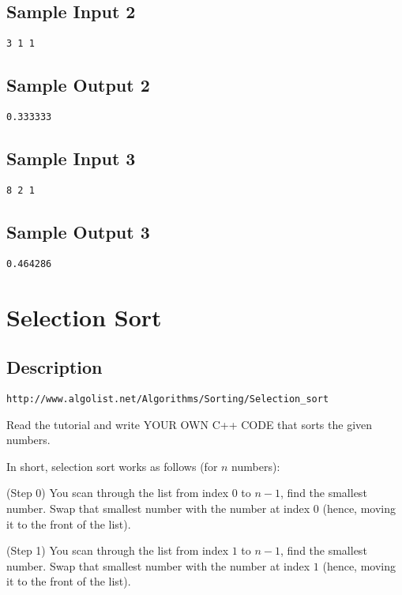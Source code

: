 \subsection*{Sample Input 2}
\begin{verbatim}
3 1 1
\end{verbatim}

\subsection*{Sample Output 2}
\begin{verbatim}
0.333333
\end{verbatim}


\subsection*{Sample Input 3}
\begin{verbatim}
8 2 1
\end{verbatim}

\subsection*{Sample Output 3}
\begin{verbatim}
0.464286
\end{verbatim}

\newpage


\section{Selection Sort}

\subsection*{Description}
\begin{verbatim}
http://www.algolist.net/Algorithms/Sorting/Selection_sort
\end{verbatim}

Read the tutorial and write YOUR OWN C++ CODE that sorts the given numbers.

In short, selection sort works as follows (for $n$ numbers):

(Step 0) You scan through the list from index $0$ to $n-1$, find the smallest number. Swap that smallest number with the number at index $0$ (hence, moving it to the front of the list).

(Step 1) You scan through the list from index $1$ to $n-1$, find the smallest number. Swap that smallest number with the number at index $1$ (hence, moving it to the front of the list).

